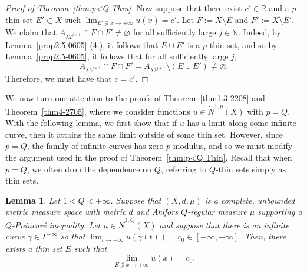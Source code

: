 \documentclass[10pt]{amsart}
\newtheorem{lemma}[theorem]{Lemma}
\numberwithin{equation}{section}
\newcommand{\N}{\mathbb{N}}
\newcommand{\Ha}{\mathcal{H}}
\newcommand{\R}{\mathbb{R}}
\begin{document}
\begin{proof}[Proof of Theorem~\ref{thm:p<Q Thin}]

 Now suppose that there exist  $c'\in\R$ and a $p$-thin set $E'\subset X$ such $\lim_{E'\not\ni x\to+\infty}u(x)=c'$.  Let $F:=X\setminus E$ and $F':=X\setminus E'$.  We claim that $A_{\lambda 2^{j+1}}\cap F\cap F'\ne\varnothing$ for all sufficiently large $j\in\N$.  Indeed, by Lemma~\ref{prop2.5-0605} (4.), it follows that $E\cup E'$ is a $p$-thin set, and so by Lemma~\ref{prop2.5-0605}, it follows that for all sufficiently large $j$, 
 \[
 A_{\lambda 2^{j+1}}\cap F\cap F'=A_{\lambda 2^{j+1}}\setminus (E\cup E')\ne\varnothing.
 \]
 Therefore, we must have that $c=c'$.
 \end{proof}

We now turn our attention to the proofs of  Theorem~\ref{thm1.3-2208} and Theorem~\ref{thm4-2705}, where we consider functions $u\in\dot N^{1,p}(X)$ with $p=Q$.  With the following lemma, we first show that if $u$ has a limit along some infinite curve, then it attains the same limit outside of some thin set.  However, since $p=Q$, the family of infinite curves has zero $p$-modulus, and so we must modify the argument used in the proof of Theorem~\ref{thm:p<Q Thin}.  Recall that when $p=Q$, we often drop the dependence on $Q$, referring to $Q$-thin sets simply as thin sets.


 \begin{lemma}\label{thm1.2-0505} 
Let  $1<Q<+\infty$. 
Suppose that $(X,d,\mu)$ is a complete, unbounded metric measure space with metric $d$ and Ahlfors $Q$-regular measure $\mu$ supporting a $Q$-Poincar\'e inequality. 
Let $u\in\dot N^{1,Q}(X)$ and suppose that there is an infinite curve $\gamma\in\Gamma^{+\infty}$ so that  $ \lim_{t\to+\infty}u(\gamma(t))=c_0\in[-\infty,+\infty]$. Then, there exists a thin set $E$ such that 
			\begin{equation}\label{eq1.2-0905}
				\lim_{E\not\ni x\to{+\infty}}u(x) =c_0.
			\end{equation}
\end{lemma}
\end{document}
